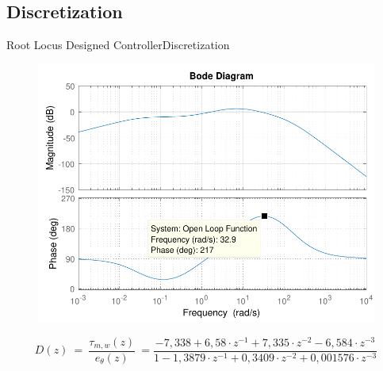 \subsection{Discretization}
\begin{frame}{Root Locus Designed Controller}{Discretization}	
\begin{figure}
	\includegraphics[scale=.543]{Pictures/bodeOL}
\end{figure}
\pause
\begin{displaymath}
	\si{D(z)\ =\ \frac{\tau_{m,w}(z)}{e_{\theta}(z)}\  = \frac{-7,338 + 6,58 \cdot z^{-1} + 7,335 \cdot z^{-2} - 6,584 \cdot z^{-3}}{1 - 1,3879 \cdot z^{-1} + 0,3409 \cdot z^{-2} + 0,001576 \cdot z^{-3}}}  \nonumber 
\end{displaymath}
\end{frame}

